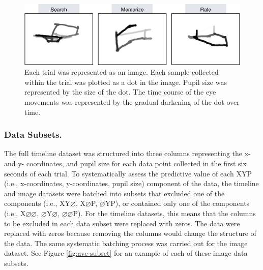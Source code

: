 \documentclass[
  english,
  man, donotrepeattitle,floatsintext]{apa6}
\begin{document}
\begin{figure}
\centering
\includegraphics{figures/cond_imgs.pdf}
\caption{\label{fig:ave-condition}Each trial was represented as an image. Each sample collected within the trial was plotted as a dot in the image. Pupil size was represented by the size of the dot. The time course of the eye movements was represented by the gradual darkening of the dot over time.}
\end{figure}

\subsubsection{Data Subsets.}

The full timeline dataset was structured into three columns representing the x- and y- coordinates, and pupil size for each data point collected in the first six seconds of each trial. To systematically assess the predictive value of each XYP (i.e., x-coordinates, y-coordinates, pupil size) component of the data, the timeline and image datasets were batched into subsets that excluded one of the components (i.e., XY\(\varnothing\), X\(\varnothing\)P, \(\varnothing\)YP), or contained only one of the components (i.e., X\(\varnothing\varnothing\), \(\varnothing\)Y\(\varnothing\), \(\varnothing\varnothing\)P). For the timeline datasets, this means that the columns to be excluded in each data subset were replaced with zeros. The data were replaced with zeros because removing the columns would change the structure of the data. The same systematic batching process was carried out for the image dataset. See Figure \ref{fig:ave-subset} for an example of each of these image data subsets.
\end{document}
